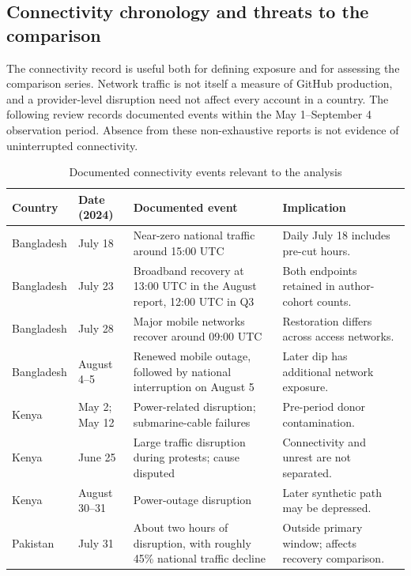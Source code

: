 \subsection{Connectivity chronology and threats to the comparison}
\label{app:connectivity_audit}

The connectivity record is useful both for defining exposure and for assessing the comparison series. Network traffic is not itself a measure of GitHub production, and a provider-level disruption need not affect every account in a country. The following review records documented events within the May 1--September 4 observation period. Absence from these non-exhaustive reports is not evidence of uninterrupted connectivity.

\begin{table}[htbp]
\centering\small
\caption{Documented connectivity events relevant to the analysis}
\label{tab:evidence_connectivity}
\begin{threeparttable}
\begin{tabular}{@{}p{}p{}p{}p{}@{}}
\toprule
Country & Date (2024) & Documented event & Implication \\
\midrule
Bangladesh & July 18 & Near-zero national traffic around 15:00 UTC \citep{belson2024} & Daily July 18 includes pre-cut hours. \\
Bangladesh & July 23 & Broadband recovery at 13:00 UTC in the August report, 12:00 UTC in Q3 \citep{belson2024,belson2024q3} & Both endpoints retained in author-cohort counts. \\
Bangladesh & July 28 & Major mobile networks recover around 09:00 UTC \citep{belson2024} & Restoration differs across access networks. \\
Bangladesh & August 4--5 & Renewed mobile outage, followed by national interruption on August 5 \citep{belson2024q3} & Later dip has additional network exposure. \\
Kenya & May 2; May 12 & Power-related disruption; submarine-cable failures \citep{cloudflare2024} & Pre-period donor contamination. \\
Kenya & June 25 & Large traffic disruption during protests; cause disputed \citep{cloudflare2024} & Connectivity and unrest are not separated. \\
Kenya & August 30--31 & Power-outage disruption \citep{belson2024q3} & Later synthetic path may be depressed. \\
Pakistan & July 31 & About two hours of disruption, with roughly 45\% national traffic decline \citep{belson2024} & Outside primary window; affects recovery comparison. \\

\end{tabular}
\end{threeparttable}
\end{table}
